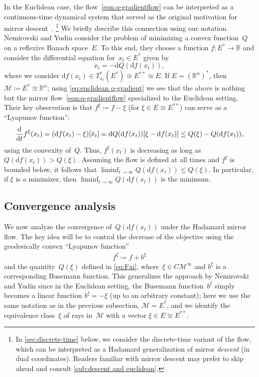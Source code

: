 \documentclass[11pt,letterpaper]{article}
\numberwithin{equation}{section}
\newcommand{\RR}{\mathbb{R}}
\newcommand{\diff}{\mathrm{d}}
\newcommand{\MM}{\mathcal{M}}
\begin{document}
In the Euclidean case, the flow~\eqref{eqn:q-gradientflow} can be interpreted as a continuous-time dynamical system that served as the original motivation for mirror descent~\cite[\S{}3.1.4]{NY1983}.%
\footnote{In \cref{sec:discrete-time} below, we consider the discrete-time variant of the flow, which can be interpreted as a Hadamard generalization of mirror \emph{descent} (in dual coordinates).
Readers familiar with mirror descent may prefer to skip ahead and consult \cref{sub:descent and euclidean}.}
We briefly describe this connection using our notation.
Nemirovski and Yudin consider the problem of minimizing a convex function~$Q$ on a reflexive Banach space~$E$.
To this end, they choose a function $f \colon E^* \to \RR$ and consider the differential equation for~$x_t \in E^*$ given by
\[ \dot x_t = -\diff Q(\diff f(x_t)), \]
where we consider $\diff f(x_t) \in T_{x_t}^*(E^*) \cong E^{**} \cong E$.
If $E = (\RR^n)^*$, then $\MM \coloneqq E^* \cong \RR^n$; using \cref{eq:euclidean q-gradient} we see that the above is nothing but the mirror flow~\eqref{eqn:q-gradientflow} specialized to the Euclidean setting.
Their key observation is that $f^\xi \coloneqq f - \xi$ (for $\xi \in E \cong E^{**}$) can serve as a ``Lyapunov function'':
\begin{equation}\label{eq:nemi yudin}
  \frac {\diff}{\diff t} f^\xi(x_t)
= ( \diff f(x_t) - \xi ) [\dot x_t]
= \diff Q(\diff f(x_t))\mleft[ \xi - \diff f(x_t) \mright]
\leq Q(\xi) - Q(\diff f(x_t)),
\end{equation}
using the convexity of~$Q$.
Thus, $f^\xi(x_t)$ is decreasing as long as $Q(\diff f(x_t)) > Q(\xi)$.
Assuming the flow is defined at all times and $f^\xi$ is bounded below, it follows that $\liminf_{t\to\infty} Q(\diff f(x_t)) \leq Q(\xi)$.
In particular, if $\xi$ is a minimizer, then $\liminf_{t\to\infty} Q(\diff f(x_t))$ is the minimum.

\subsection{Convergence analysis}\label{sub:flow convergence}
We now analyze the convergence of~$Q(\diff f(x_t))$ under the Hadamard mirror flow.
The key idea will be to control the decrease of the objective using the geodesically convex ``Lyapunov function''
\begin{align}\label{eq:lyapunov}
    f^\xi \coloneqq f + b^\xi
\end{align}
and the quantity~$Q(\xi)$ defined in \cref{eq:Fxi}, where~$\xi \in C\MM^\infty$ and $b^\xi$ is a corresponding Busemann function.
This generalizes the approach by Nemirovski and Yudin since in the Euclidean setting, the Busemann function~$b^\xi$ simply becomes a linear function $b^\xi = -\xi$ (up to an arbitrary constant); here we use the same notation as in the previous subsection, $\MM = E^*$, and we identify the equivalence class~$\xi$ of rays in~$\MM$ with a vector $\xi \in E\cong E^{**}$.
\end{document}
